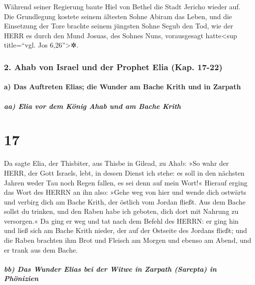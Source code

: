 Während seiner Regierung baute Hiel von Bethel die Stadt
Jericho wieder auf. Die Grundlegung kostete seinem ältesten Sohne Abiram
das Leben, und die Einsetzung der Tore brachte seinem jüngsten Sohne
Segub den Tod, wie der HERR es durch den Mund Josuas, des Sohnes Nuns,
vorausgesagt hatte\textless sup title=``vgl. Jos 6,26''\textgreater✲.

\hypertarget{ahab-von-israel-und-der-prophet-elia-kap.-17-22}{%
\subsubsection{2. Ahab von Israel und der Prophet Elia (Kap.
17-22)}\label{ahab-von-israel-und-der-prophet-elia-kap.-17-22}}

\hypertarget{a-das-auftreten-elias-die-wunder-am-bache-krith-und-in-zarpath}{%
\paragraph{a) Das Auftreten Elias; die Wunder am Bache Krith und in
Zarpath}\label{a-das-auftreten-elias-die-wunder-am-bache-krith-und-in-zarpath}}

\hypertarget{aa-elia-vor-dem-kuxf6nig-ahab-und-am-bache-krith}{%
\subparagraph{aa) Elia vor dem König Ahab und am Bache
Krith}\label{aa-elia-vor-dem-kuxf6nig-ahab-und-am-bache-krith}}

\hypertarget{section-16}{%
\section{17}\label{section-16}}

Da sagte Elia, der Thisbiter, aus Thisbe in Gilead, zu
Ahab: »So wahr der HERR, der Gott Israels, lebt, in dessen Dienst ich
stehe: es soll in den nächsten Jahren weder Tau noch Regen fallen, es
sei denn auf mein Wort!« Hierauf erging das Wort des HERRN
an ihn also: »Gehe weg von hier und wende dich ostwärts
und verbirg dich am Bache Krith, der östlich vom Jordan fließt.
Aus dem Bache sollst du trinken, und den Raben habe ich
geboten, dich dort mit Nahrung zu versorgen.« Da ging er
weg und tat nach dem Befehl des HERRN: er ging hin und ließ sich am
Bache Krith nieder, der auf der Ostseite des Jordans fließt;
und die Raben brachten ihm Brot und Fleisch am Morgen und
ebenso am Abend, und er trank aus dem Bache.

\hypertarget{bb-das-wunder-elias-bei-der-witwe-in-zarpath-sarepta-in-phuxf6nizien}{%
\subparagraph{bb) Das Wunder Elias bei der Witwe in Zarpath (Sarepta) in
Phönizien}\label{bb-das-wunder-elias-bei-der-witwe-in-zarpath-sarepta-in-phuxf6nizien}}

